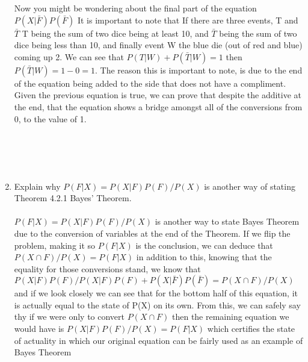 \begin{enumerate}[label=(\alph*)]
     Now you might be wondering about the final part of the equation $P(X|\bar{F})P(\bar{F})$ It is important to note that If there are three events, T and $\bar{T}$ T being the sum of two dice being at least 10, and $\bar{T}$ being the sum of two dice being less than 10, and finally event W the blue die (out of red and blue) coming up 2. We can see that $P(T|W) + P(\bar{T}|W) = 1$ then $P(\bar{T}|W) = 1 - 0 = 1$. The reason this is important to note, is due to the end of the equation being added to the side that does not have a compliment. Given the previous equation is true, we can prove that despite the additive at the end, that the equation shows a bridge amongst all of the conversions from 0, to the value of 1. \\
     
     \\
     \\
     \\\\
     \item Explain why $P(F|X) = P(X|F)P(F)/P(X)$ is another way of stating Theorem 4.2.1 Bayes’ Theorem.
     \\\\
     $P(F|X) = P(X|F)P(F)/P(X)$ is another way to state Bayes Theorem due to the conversion of variables at the end of the Theorem. If we flip the problem, making it so $P(F|X)$ is the conclusion, we can deduce that $P(X \cap F)/P(X) = P(F|X)$ in addition to this, knowing that the equality for those conversions stand, we know that $P(X|F)P(F)/P(X|F)P(F) + P(X|\bar{F})P(\bar{F}) = P(X \cap F)/P(X)$ and if we look closely we can see that for the bottom half of this equation, it is actually equal to the state of P(X) on its own. From this, we can safely say thy if we were only to convert $P(X \cap F)$ then the remaining equation we would have is $P(X|F)P(F)/P(X) = P(F|X)$ which certifies the state of actuality in which our original equation can be fairly used as an example of Bayes Theorem
     \\\\
 \end{enumerate}
